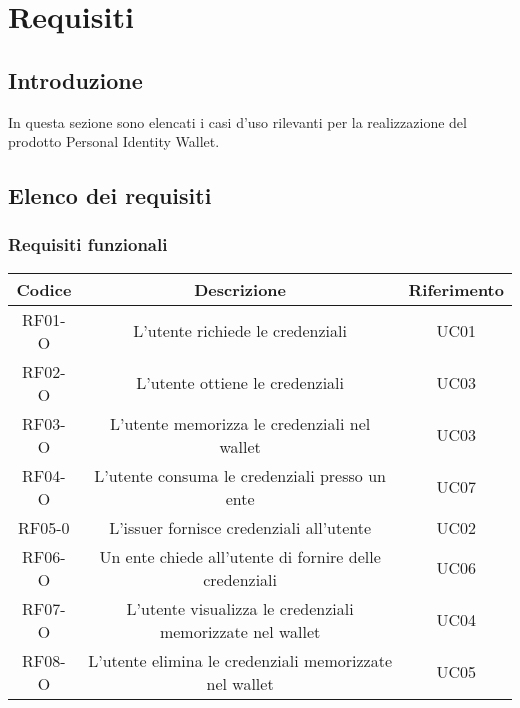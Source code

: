 \section{Requisiti}
\subsection{Introduzione}
In questa sezione sono elencati i casi d'uso rilevanti per la realizzazione del prodotto Personal Identity Wallet.
\subsection{Elenco dei requisiti}
\subsubsection*{Requisiti funzionali} %
    \begin{longtable}{|c|c|c|}
        \hline
        \textbf{Codice} & \textbf{Descrizione} & \textbf{Riferimento} \\
        \hline
        RF01-O & L'utente richiede le credenziali& UC01\\
        RF02-O & L'utente ottiene le credenziali& UC03\\
        RF03-O & L'utente memorizza le credenziali nel wallet\glo{}& UC03\\
        RF04-O & L'utente consuma le credenziali presso un ente & UC07\\
        RF05-0 & L'issuer\glo{} fornisce credenziali all'utente & UC02\\
        RF06-O & Un ente chiede all'utente di fornire delle credenziali& UC06\\
        RF07-O & L'utente visualizza le credenziali memorizzate nel wallet & UC04\\
        RF08-O & L'utente elimina le credenziali memorizzate nel wallet & UC05\\
        \hline
    \end{longtable}
